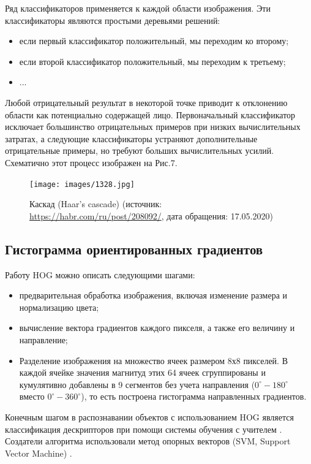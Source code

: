 \documentclass[14pt]{matmex-diploma-custom}
\begin{document}
        Ряд классификаторов применяется к каждой области изображения. Эти классификаторы являются простыми деревьями решений:
        \begin{itemize}
            \item если первый классификатор положительный, мы переходим ко второму;
            \item если второй классификатор положительный, мы переходим к третьему;
            \item ...
        \end{itemize}
        Любой отрицательный результат в некоторой точке приводит к отклонению области как потенциально содержащей лицо. Первоначальный классификатор исключает большинство отрицательных примеров при низких вычислительных затратах, а следующие классификаторы устраняют дополнительные отрицательные примеры, но требуют больших вычислительных усилий. Схематично этот процесс изображен на Рис.7.
        
            \begin{figure}[h]
                    \centering
                    \texttt{[image: images/1328.jpg]}
                    \caption{Каскад (Haar's cascade) (источник: \url{https://habr.com/ru/post/208092/}, дата обращения: 17.05.2020)}
            \end{figure}    
        
            
    \subsection{Гистограмма ориентированных градиентов}
        Работу HOG \cite{hog} можно описать следующими шагами:
        \begin{itemize}
            \item предварительная обработка изображения, включая изменение размера и нормализацию цвета;
            \item вычисление вектора градиентов каждого пикселя, а также его величину и направление;
            \item Разделение изображения на множество ячеек размером 8х8 пикселей. В каждой ячейке значения магнитуд этих 64 ячеек сгруппированы и кумулятивно добавлены в 9 сегментов без учета направления ($0^{\circ}-180^{\circ}$ вместо $0^{\circ}-360^{\circ}$), то есть построена гистограмма направленных градиентов.
        \end{itemize} \par
        
        Конечным шагом в распознавании объектов с использованием HOG является классификация дескрипторов при помощи системы обучения с учителем \cite{wiki:supervised}. Создатели алгоритма использовали метод опорных векторов (SVM, Support Vector Machine) \cite{wiki:SVM}.
    
\end{document}
